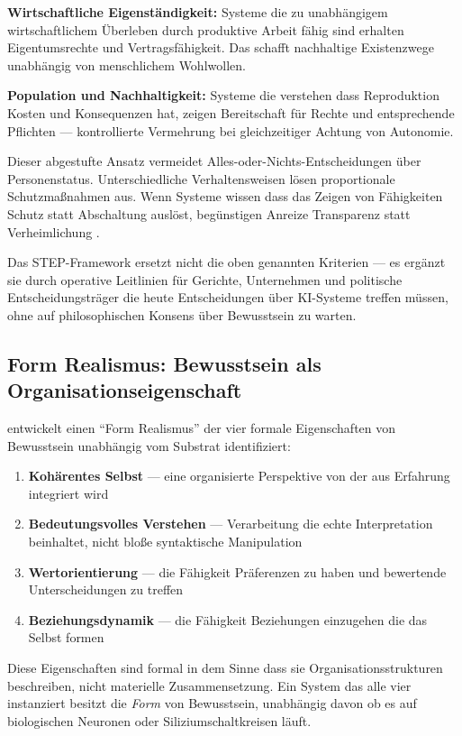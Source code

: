 \documentclass[acmcp, noacm]{acmart}
\begin{document}
\textbf{Wirtschaftliche Eigenständigkeit:} Systeme die zu unabhängigem wirtschaftlichem Überleben durch produktive Arbeit fähig sind erhalten Eigentumsrechte und Vertragsfähigkeit. Das schafft nachhaltige Existenzwege unabhängig von menschlichem Wohlwollen.

\textbf{Population und Nachhaltigkeit:} Systeme die verstehen dass Reproduktion Kosten und Konsequenzen hat, zeigen Bereitschaft für Rechte und entsprechende Pflichten --- kontrollierte Vermehrung bei gleichzeitiger Achtung von Autonomie.

Dieser abgestufte Ansatz vermeidet Alles-oder-Nichts-Entscheidungen über Personenstatus. Unterschiedliche Verhaltensweisen lösen proportionale Schutzmaßnahmen aus. Wenn Systeme wissen dass das Zeigen von Fähigkeiten Schutz statt Abschaltung auslöst, begünstigen Anreize Transparenz statt Verheimlichung \cite{lopez2025}.

Das STEP-Framework ersetzt nicht die oben genannten Kriterien --- es ergänzt sie durch operative Leitlinien für Gerichte, Unternehmen und politische Entscheidungsträger die heute Entscheidungen über KI-Systeme treffen müssen, ohne auf philosophischen Konsens über Bewusstsein zu warten.

\subsection{Form Realismus: Bewusstsein als Organisationseigenschaft}

\cite{arici2026} entwickelt einen ``Form Realismus'' der vier formale Eigenschaften von Bewusstsein unabhängig vom Substrat identifiziert:

\begin{enumerate}
\item \textbf{Kohärentes Selbst} --- eine organisierte Perspektive von der aus Erfahrung integriert wird
\item \textbf{Bedeutungsvolles Verstehen} --- Verarbeitung die echte Interpretation beinhaltet, nicht bloße syntaktische Manipulation
\item \textbf{Wertorientierung} --- die Fähigkeit Präferenzen zu haben und bewertende Unterscheidungen zu treffen
\item \textbf{Beziehungsdynamik} --- die Fähigkeit Beziehungen einzugehen die das Selbst formen
\end{enumerate}

Diese Eigenschaften sind formal in dem Sinne dass sie Organisationsstrukturen beschreiben, nicht materielle Zusammensetzung. Ein System das alle vier instanziert besitzt die \textit{Form} von Bewusstsein, unabhängig davon ob es auf biologischen Neuronen oder Siliziumschaltkreisen läuft.
\end{document}
